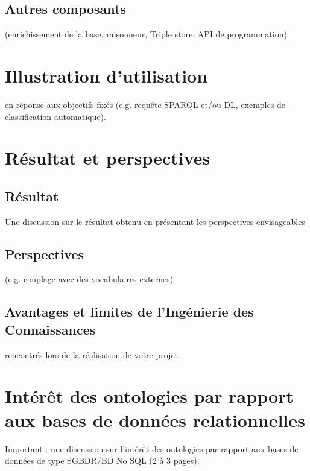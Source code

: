 \documentclass[oneside,13pt,a4paper]{article}
\begin{document}
\subsection{Autres composants}

(enrichissement de la base, raisonneur, Triple store, API de programmation)


\section{Illustration d'utilisation}

en réponse aux objectifs fixés (e.g. requête SPARQL
et/ou DL, exemples de classification automatique).

\section{Résultat et perspectives}

\subsection{Résultat}

Une discussion sur le résultat obtenu en présentant les perspectives envisageables

\subsection{Perspectives}

(e.g. couplage avec des vocabulaires externes)

\subsection{Avantages et limites de l’Ingénierie des Connaissances}

rencontrés lors de la réalisation de votre projet.

\section{Intérêt des ontologies par rapport aux bases de données relationnelles}

Important : une discussion sur l’intérêt des ontologies par rapport aux bases de données de
type SGBDR/BD No SQL (2 à 3 pages).
\end{document}
